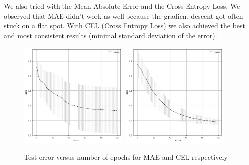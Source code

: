 \documentclass{article}
\begin{document}
We also tried with the Mean Absolute Error and the Cross Entropy Loss. We observed that MAE didn't work as well because the gradient descent got often stuck on a flat spot. With CEL (Cross Entropy Loss) we also achieved the best and most consistent results (minimal standard deviation of the error).
  
\begin{figure}[H]
\begin{center}
\includegraphics[width=0.47\textwidth]{err_mae}
\includegraphics[width=0.47\textwidth]{cel_err}
\caption{Test error versus number of epochs for MAE and CEL respectively}
\end{center}
\end{figure}
\end{document}
